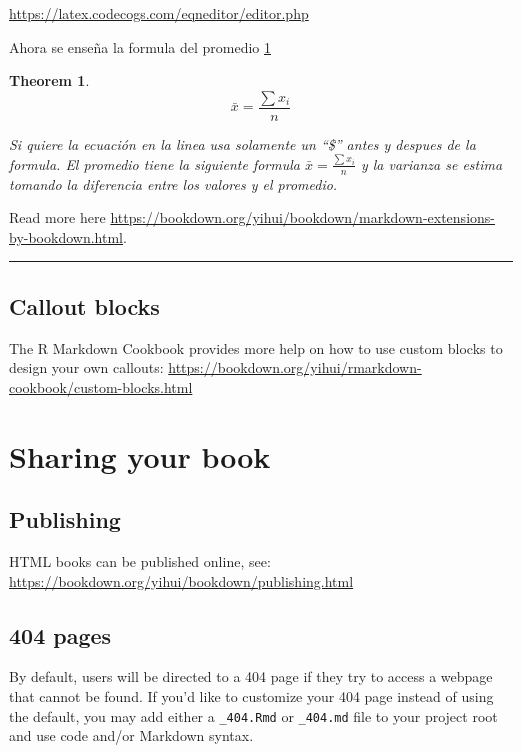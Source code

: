 \documentclass[
]{book}
\newtheorem{theorem}{Theorem}[chapter]
\theoremstyle{definition}
\theoremstyle{definition}
\theoremstyle{definition}
\theoremstyle{definition}
\theoremstyle{remark}
\begin{document}
\url{https://latex.codecogs.com/eqneditor/editor.php}

Ahora se enseña la formula del promedio \ref{thm:promedio}

\begin{theorem}
\protect\hypertarget{thm:promedio}{}\label{thm:promedio}\[\bar{x}= \frac{\sum x_{i}}{n}\]

Si quiere la ecuación en la linea usa solamente un ``\$'' antes y despues de la formula.
El promedio tiene la siguiente formula \(\bar{x}= \frac{\sum x_{i}}{n}\) y la varianza se estima tomando la diferencia entre los valores y el promedio.
\end{theorem}

Read more here \url{https://bookdown.org/yihui/bookdown/markdown-extensions-by-bookdown.html}.

\begin{center}\rule{0.5\linewidth}{0.5pt}\end{center}

\hypertarget{callout-blocks}{%
\section{Callout blocks}\label{callout-blocks}}

The R Markdown Cookbook provides more help on how to use custom blocks to design your own callouts: \url{https://bookdown.org/yihui/rmarkdown-cookbook/custom-blocks.html}

\hypertarget{sharing-your-book}{%
\chapter{Sharing your book}\label{sharing-your-book}}

\hypertarget{publishing}{%
\section{Publishing}\label{publishing}}

HTML books can be published online, see: \url{https://bookdown.org/yihui/bookdown/publishing.html}

\hypertarget{pages}{%
\section{404 pages}\label{pages}}

By default, users will be directed to a 404 page if they try to access a webpage that cannot be found. If you'd like to customize your 404 page instead of using the default, you may add either a \texttt{\_404.Rmd} or \texttt{\_404.md} file to your project root and use code and/or Markdown syntax.
\end{document}
